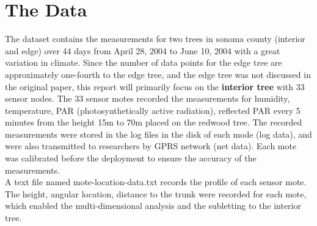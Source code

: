 \documentclass[11pt]{article}
\begin{document}
{\section{The Data}
The dataset contains the measurements for two trees in sonoma county (interior and edge) over 44 days from April 28, 2004 to June 10, 2004 with a great variation in climate. Since the number of data points for the edge tree are approximately one-fourth to the edge tree, and the edge tree was not discussed in the original paper, this report will primarily focus on the \textbf{interior tree} with 33 sensor nodes. The 33 sensor motes recorded the measurements for humidity, temperature, PAR (photosynthetically active radiation), reflected PAR every 5 minutes from the height 15m to 70m placed on the redwood tree. The recorded measurements were stored in the log files in the disk of each mode (log data), and were also transmitted to researchers by GPRS network (net data). Each mote was calibrated before the deployment to ensure the accuracy of the measurements.\\
A text file named mote-location-data.txt records the profile of each sensor mote. The height, angular location, distance to the trunk were recorded for each mote, which enabled the multi-dimensional analysis and the subletting to the interior tree. 

}
\end{document}
